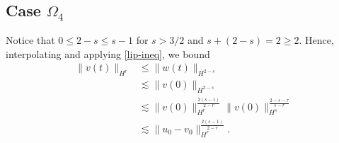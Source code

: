 \documentclass[12pt,reqno]{amsart}
\numberwithin{equation}{section}  %
\begin{document}
\subsection{Case $\Omega_{4}$} 
\label{ssec:case-4}
Notice that $0 \le 2-s \le s-1$ for $s>3/2$ and $s + (2-s) = 2 \ge 2$. Hence,
interpolating and applying
\eqref{lip-ineq}, we bound 
%
%
%
%
\begin{equation*}
\begin{split}
  \| v(t) \|_{H^{r}}
  & \le \|w(t) \|_{H^{2-s}}
  \\
  & \lesssim \|v(0) \|_{H^{2-s}}
  \\
  & \lesssim \| v(0) \|_{H^{r}}^{\frac{2(s-1)}{2-r}} \|v(0)
  \|_{H^{s}}^{\frac{2-s-r}{s-r}}
  \\
  & \lesssim \| u_{0} - v_{0} \|_{H^{r}}^{\frac{2(s-1)}{2-r}}.
\end{split}
\end{equation*}
%
%
%
\appendix
%
%
%
%
%
%
%
%
\end{document}
